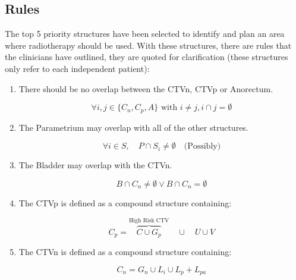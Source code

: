 \documentclass[12pt,twoside]{report}
\begin{document}
\subsection{Rules}

The top 5 priority structures have been selected to identify and plan an area where radiotherapy should be used. With these structures, there are rules that the clinicians have outlined, they are quoted for clarification (these structures only refer to each independent patient):

\begin{enumerate}
  \item There should be no overlap between the CTVn, CTVp or Anorectum.

        \begin{equation}
          \forall{i,j \in \{C_n, C_p, A\}}\text{ with } i \neq j, i \cap j = \emptyset
        \end{equation}

  \item The Parametrium may overlap with all of the other structures.

        \begin{equation}
          \forall i \in S, \quad P \cap S_i \neq \emptyset \quad \text{(Possibly)}
        \end{equation}

  \item The Bladder may overlap with the CTVn.

        \begin{equation}
          B \cap C_n \neq \emptyset \vee B \cap C_n = \emptyset\label{eq:ctvn}
        \end{equation}

  \item The CTVp is defined as a compound structure containing:

        \begin{equation}
          C_p = \overbrace{C \cup G_p}^{\text{High Risk CTV}} \quad \cup \quad U \cup V\label{eq:ctvp}
        \end{equation}

  \item The CTVn is defined as a compound structure containing:

        \begin{equation}
          C_n = G_n \cup L_i \cup L_p + L_{pa}
        \end{equation}

\end{enumerate}
\end{document}
